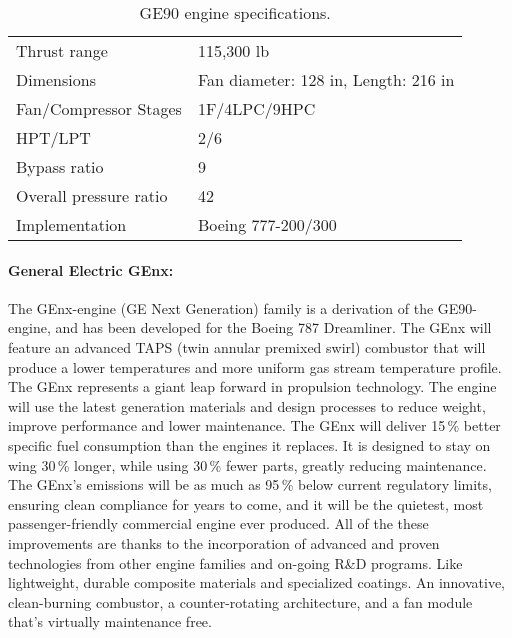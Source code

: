 \begin{table}[!htb!]
  \centering
\begin{tabular}{|p{}|p{}|}\hline
Thrust range& 115,300 lb\\
Dimensions & Fan diameter: 128 in, Length: 216 in\\
Fan/Compressor Stages & 1F/4LPC/9HPC\\
HPT/LPT & 2/6\\
Bypass ratio& 9\\
Overall pressure ratio & 42\\
Implementation& Boeing 777-200/300\\\hline
\end{tabular}
  \caption{\label{TAB_GE90}GE90 engine specifications.}
\end{table}

\paragraph{General Electric GEnx:}
The GEnx-engine (GE Next Generation) family is a derivation of the GE90-engine, and has been developed for the Boeing 787 Dreamliner. The GEnx will feature an advanced TAPS (twin annular premixed swirl) combustor that will produce a lower temperatures and more uniform gas stream temperature profile. The GEnx represents a giant leap forward in propulsion technology. The engine will use the latest generation materials and design processes to reduce weight, improve performance and lower maintenance. The GEnx will deliver 15\,\%  better specific fuel consumption than the engines it replaces. It is designed to stay on wing 30\,\%  longer, while using 30\,\% fewer parts, greatly reducing maintenance. The GEnx's emissions will be as much as 95\,\%  below current regulatory limits, ensuring clean compliance for years to come, and it will be the quietest, most passenger-friendly commercial engine ever produced. All of the these improvements are thanks to the incorporation of advanced and proven technologies from other engine families and on-going R\&D programs. Like lightweight, durable composite materials and specialized coatings. An innovative, clean-burning combustor, a counter-rotating architecture, and a fan module that's virtually maintenance free.

